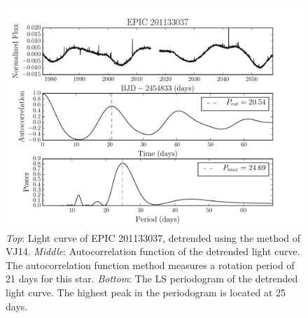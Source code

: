 \begin{figure}
\begin{center}
\includegraphics[width=6in, clip=true]{figures/rotation201133037.pdf}
\caption[Example 1: an ACF and LS periodogram of a detrended light curve.]
{{\it Top}: Light curve of EPIC 201133037, detrended using the method
	of VJ14.
	{\it Middle}: Autocorrelation function of the detrended light
	curve. The autocorrelation function method measures a rotation period
	of 21 days for this star.
	{\it Bottom}: The LS periodogram of the detrended light curve.
	The highest peak in the periodogram is located at 25 days.}
\label{fig:rotation_poster_child}
\end{center}
\end{figure}

